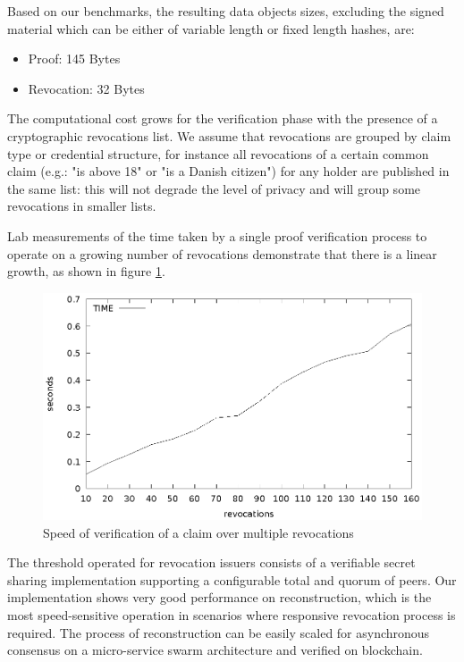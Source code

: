 Based on our benchmarks, the resulting data objects sizes, excluding
the signed material which can be either of variable length or fixed
length hashes, are:
\begin{itemize}
    \item Proof:  145 Bytes
    \item Revocation: 32 Bytes
\end{itemize}

The computational cost grows for the verification phase with the
presence of a cryptographic revocations list. We assume that
revocations are grouped by claim type or credential structure, for
instance all revocations of a certain common claim (e.g.: "is above
18" or "is a Danish citizen") for any holder are published in the same
list: this will not degrade the level of privacy and will group some
revocations in smaller lists.

Lab measurements of the time taken by a single proof verification
process to operate on a growing number of revocations demonstrate that
there is a linear growth, as shown in figure
\ref{fig:verifyrevocations}.

\begin{figure}
    \centering
    \includegraphics[width=1\linewidth]{verifyrevocations.eps}

    \caption{Speed of verification of a claim over multiple revocations}
    \label{fig:verifyrevocations}
\end{figure}

The threshold operated for revocation issuers consists of a verifiable
secret sharing implementation supporting a configurable total and
quorum of peers. Our implementation shows very good performance on
reconstruction, which is the most speed-sensitive operation in
scenarios where responsive revocation process is required. The process
of reconstruction can be easily scaled for asynchronous consensus on a
micro-service swarm architecture and verified on blockchain.

